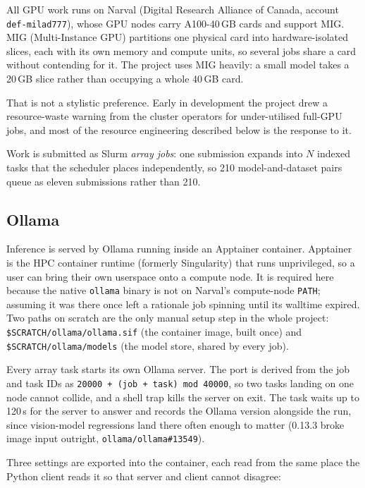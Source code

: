 \documentclass[11pt,a4paper]{article}
\newcommand{\file}[1]{{\small\texttt{#1}}}
\begin{document}
All GPU work runs on Narval (Digital Research Alliance of Canada, account
\texttt{def-milad777}), whose GPU nodes carry A100-40\,GB cards and support MIG.
MIG (Multi-Instance GPU) partitions one physical card into hardware-isolated
slices, each with its own memory and compute units, so several jobs share a card
without contending for it. The project uses MIG heavily: a small model takes a
20\,GB slice rather than occupying a whole 40\,GB card.

That is not a stylistic preference. Early in development the project drew a
resource-waste warning from the cluster operators for under-utilised full-GPU
jobs, and most of the resource engineering described below is the response to it.

Work is submitted as Slurm \emph{array jobs}: one submission expands into $N$
indexed tasks that the scheduler places independently, so 210 model-and-dataset
pairs queue as eleven submissions rather than 210.

\subsection{Ollama}

Inference is served by Ollama running inside an Apptainer container. Apptainer is
the HPC container runtime (formerly Singularity) that runs unprivileged, so a
user can bring their own userspace onto a compute node. It is required here
because the native \texttt{ollama} binary is not on Narval's compute-node
\texttt{PATH}; assuming it was there once left a rationale job spinning until its
walltime expired. Two paths on scratch are the only manual setup step in the
whole project: \file{\$SCRATCH/ollama/ollama.sif} (the container image, built
once) and \file{\$SCRATCH/ollama/models} (the model store, shared by every job).

Every array task starts its own Ollama server. The port is derived from the job
and task IDs as \texttt{20000 + (job + task) mod 40000}, so two tasks landing on
one node cannot collide, and a shell trap kills the server on exit. The task
waits up to 120\,s for the server to answer and records the Ollama version
alongside the run, since vision-model regressions land there often enough to
matter (0.13.3 broke image input outright, \texttt{ollama/ollama\#13549}).

Three settings are exported into the container, each read from the same place the
Python client reads it so that server and client cannot disagree:
\end{document}
